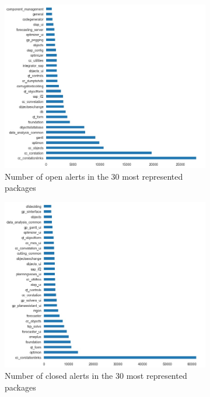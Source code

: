 \begin{figure}[H]
\begin{subfigure}{0.5\textwidth}
		\centering
		\includegraphics[scale=0.2]{./src/data_analysis/closed_packages_barh.jpg}
		\caption{Number of open alerts in the 30 most represented packages}\label{}
	\end{subfigure}%
	\begin{subfigure}{0.5\textwidth}
		\centering
		\includegraphics[scale=0.2]{./src/data_analysis/open_package_barh.jpg}
		\caption{Number of closed alerts in the 30 most represented packages}\label{}
	\end{subfigure}\\
	\begin{subfigure}{0.5\textwidth}

\end{subfigure}
\end{figure}
